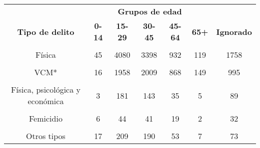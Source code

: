 \begin{tabular}[t]{ccccccc}
\toprule
\multicolumn{1}{c}{\textbf{ }} & \multicolumn{5}{c}{\textbf{Grupos de edad}} & \multicolumn{1}{c}{\textbf{ }} \\
\cmidrule(l{3pt}r{3pt}){2-6}
\textbf{Tipo de delito} & \textbf{0-14} & \textbf{15-29} & \textbf{30-45} & \textbf{45-64} & \textbf{65+} & \textbf{Ignorado}\\
\midrule
\cellcolor[HTML]{A8A4FB}{Psicológica} & \cellcolor[HTML]{A8A4FB}{58} & \cellcolor[HTML]{A8A4FB}{5765} & \cellcolor[HTML]{A8A4FB}{5921} & \cellcolor[HTML]{A8A4FB}{2193} & \cellcolor[HTML]{A8A4FB}{348} & \cellcolor[HTML]{A8A4FB}{3162}\\
Física & 45 & 4080 & 3398 & 932 & 119 & 1758\\
\cellcolor[HTML]{A8A4FB}{Física y psicológica} & \cellcolor[HTML]{A8A4FB}{35} & \cellcolor[HTML]{A8A4FB}{3841} & \cellcolor[HTML]{A8A4FB}{3011} & \cellcolor[HTML]{A8A4FB}{829} & \cellcolor[HTML]{A8A4FB}{90} & \cellcolor[HTML]{A8A4FB}{1772}\\
VCM* & 16 & 1958 & 2009 & 868 & 149 & 995\\
\cellcolor[HTML]{A8A4FB}{Psicológica y económica} & \cellcolor[HTML]{A8A4FB}{NA} & \cellcolor[HTML]{A8A4FB}{183} & \cellcolor[HTML]{A8A4FB}{221} & \cellcolor[HTML]{A8A4FB}{89} & \cellcolor[HTML]{A8A4FB}{23} & \cellcolor[HTML]{A8A4FB}{89}\\
Física, psicológica y económica & 3 & 181 & 143 & 35 & 5 & 89\\
\cellcolor[HTML]{A8A4FB}{VCM y económica} & \cellcolor[HTML]{A8A4FB}{NA} & \cellcolor[HTML]{A8A4FB}{96} & \cellcolor[HTML]{A8A4FB}{124} & \cellcolor[HTML]{A8A4FB}{50} & \cellcolor[HTML]{A8A4FB}{6} & \cellcolor[HTML]{A8A4FB}{58}\\
Femicidio & 6 & 44 & 41 & 19 & 2 & 32\\
\cellcolor[HTML]{A8A4FB}{Física y económica} & \cellcolor[HTML]{A8A4FB}{1} & \cellcolor[HTML]{A8A4FB}{46} & \cellcolor[HTML]{A8A4FB}{42} & \cellcolor[HTML]{A8A4FB}{10} & \cellcolor[HTML]{A8A4FB}{NA} & \cellcolor[HTML]{A8A4FB}{21}\\
Otros tipos & 17 & 209 & 190 & 53 & 7 & 73\\
\bottomrule
\end{tabular}

